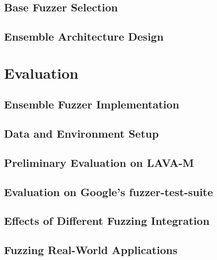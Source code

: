 \documentclass[letterpaper,twocolumn,10pt]{article}
\begin{document}
	\subsection{Base Fuzzer Selection}
	\label{Base Fuzzer Selection}
    
	\subsection{Ensemble Architecture Design}
	\label{Ensemble Architecture Design}
    


\section{Evaluation}
\label{Evaluation}

	\vspace{-0.2cm}
  \subsection{Ensemble Fuzzer Implementation}
  	\label{implementation}
    
  \vspace{-0.1cm}
  \subsection{Data and Environment Setup}
    
  \vspace{-0.1cm}
  \subsection{Preliminary Evaluation on LAVA-M }
    
  \subsection{Evaluation on Google's fuzzer-test-suite}
     
  \subsection{Effects of Different Fuzzing Integration} 
    
    \label{effect}
 \subsection{Fuzzing Real-World Applications} 
    
    	
\end{document}
